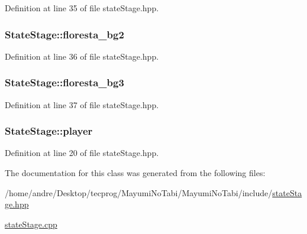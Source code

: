 Definition at line 35 of file state\-Stage.\-hpp.

\hypertarget{class_state_stage_a7fd64e8138046b0c6bf394258bef3170}{
\subsubsection[{floresta\-\_\-bg2}]{ State\-Stage\-::floresta\-\_\-bg2}}\label{class_state_stage_a7fd64e8138046b0c6bf394258bef3170}


Definition at line 36 of file state\-Stage.\-hpp.

\hypertarget{class_state_stage_aacd2bf739abcd238d50374f1331f0cf7}{
\subsubsection[{floresta\-\_\-bg3}]{ State\-Stage\-::floresta\-\_\-bg3}}\label{class_state_stage_aacd2bf739abcd238d50374f1331f0cf7}


Definition at line 37 of file state\-Stage.\-hpp.

\hypertarget{class_state_stage_a583d180c7de8f11baffb0bd0159f9e89}{
\subsubsection[{player}]{ State\-Stage\-::player}}\label{class_state_stage_a583d180c7de8f11baffb0bd0159f9e89}


Definition at line 20 of file state\-Stage.\-hpp.



The documentation for this class was generated from the following files\-:\begin{DoxyCompactItemize}
\item 
/home/andre/\-Desktop/tecprog/\-Mayumi\-No\-Tabi/\-Mayumi\-No\-Tabi/include/\hyperlink{state_stage_8hpp}{state\-Stage.\-hpp}\item 
\hyperlink{state_stage_8cpp}{state\-Stage.\-cpp}\end{DoxyCompactItemize}
